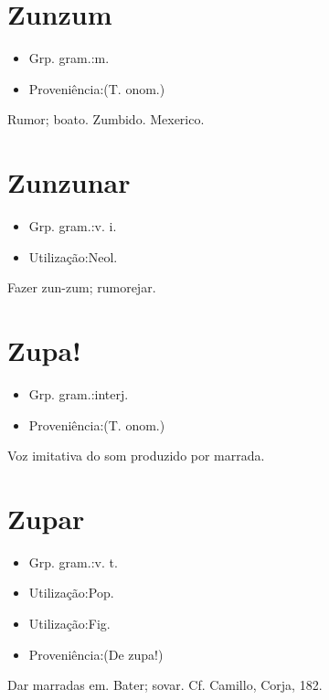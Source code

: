 \section{Zunzum}
\begin{itemize}
\item {Grp. gram.:m.}
\end{itemize}
\begin{itemize}
\item {Proveniência:(T. onom.)}
\end{itemize}
Rumor; boato.
Zumbido.
Mexerico.
\section{Zunzunar}
\begin{itemize}
\item {Grp. gram.:v. i.}
\end{itemize}
\begin{itemize}
\item {Utilização:Neol.}
\end{itemize}
Fazer zun-zum; rumorejar.
\section{Zupa!}
\begin{itemize}
\item {Grp. gram.:interj.}
\end{itemize}
\begin{itemize}
\item {Proveniência:(T. onom.)}
\end{itemize}
Voz imitativa do som produzido por marrada.
\section{Zupar}
\begin{itemize}
\item {Grp. gram.:v. t.}
\end{itemize}
\begin{itemize}
\item {Utilização:Pop.}
\end{itemize}
\begin{itemize}
\item {Utilização:Fig.}
\end{itemize}
\begin{itemize}
\item {Proveniência:(De \textunderscore zupa!\textunderscore )}
\end{itemize}
Dar marradas em.
Bater; sovar. Cf. Camillo, \textunderscore Corja\textunderscore , 182.
